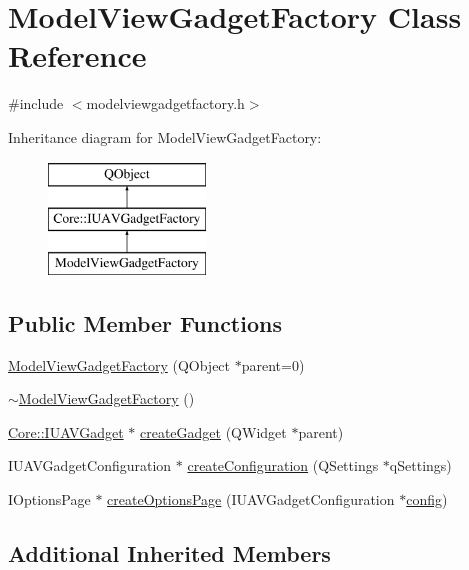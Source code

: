 \hypertarget{class_model_view_gadget_factory}{\section{Model\-View\-Gadget\-Factory Class Reference}
\label{class_model_view_gadget_factory}
}


{\ttfamily \#include $<$modelviewgadgetfactory.\-h$>$}

Inheritance diagram for Model\-View\-Gadget\-Factory\-:\begin{figure}[H]
\begin{center}
\leavevmode
\includegraphics[height=3.000000cm]{class_model_view_gadget_factory}
\end{center}
\end{figure}
\subsection*{Public Member Functions}
\begin{DoxyCompactItemize}
\item 
\hyperlink{group___model_view_plugin_gab4ca362258332f3214c66cc63ba54d77}{Model\-View\-Gadget\-Factory} (Q\-Object $\ast$parent=0)
\item 
\hyperlink{group___model_view_plugin_ga7bdf383eb25b1a5226f036371be723b5}{$\sim$\-Model\-View\-Gadget\-Factory} ()
\item 
\hyperlink{class_core_1_1_i_u_a_v_gadget}{Core\-::\-I\-U\-A\-V\-Gadget} $\ast$ \hyperlink{group___model_view_plugin_ga10c8c524e828527192c4821b769ab1fe}{create\-Gadget} (Q\-Widget $\ast$parent)
\item 
I\-U\-A\-V\-Gadget\-Configuration $\ast$ \hyperlink{group___model_view_plugin_gaa2d13e8c20201017fc03b9ffd781247c}{create\-Configuration} (Q\-Settings $\ast$q\-Settings)
\item 
I\-Options\-Page $\ast$ \hyperlink{group___model_view_plugin_gacccb2300c14739970fbef9a38365c070}{create\-Options\-Page} (I\-U\-A\-V\-Gadget\-Configuration $\ast$\hyperlink{deflate_8c_a4473b5227787415097004fd39f55185e}{config})
\end{DoxyCompactItemize}
\subsection*{Additional Inherited Members}


